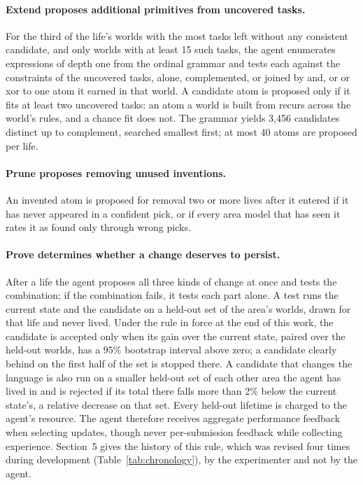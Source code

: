 \documentclass[11pt]{article}
\begin{document}
\paragraph{Extend proposes additional primitives from uncovered tasks.} For the third of the life's worlds with the most tasks left without any consistent candidate, and only worlds with at least 15 such tasks, the agent enumerates expressions of depth one from the ordinal grammar and tests each against the constraints of the uncovered tasks, alone, complemented, or joined by and, or or xor to one atom it earned in that world. A candidate atom is proposed only if it fits at least two uncovered tasks: an atom a world is built from recurs across the world's rules, and a chance fit does not. The grammar yields 3,456 candidates distinct up to complement, searched smallest first; at most 40 atoms are proposed per life.

\paragraph{Prune proposes removing unused inventions.} An invented atom is proposed for removal two or more lives after it entered if it has never appeared in a confident pick, or if every area model that has seen it rates it as found only through wrong picks.

\paragraph{Prove determines whether a change deserves to persist.} After a life the agent proposes all three kinds of change at once and tests the combination; if the combination fails, it tests each part alone. A test runs the current state and the candidate on a held-out set of the area's worlds, drawn for that life and never lived. Under the rule in force at the end of this work, the candidate is accepted only when its gain over the current state, paired over the held-out worlds, has a 95\% bootstrap interval above zero; a candidate clearly behind on the first half of the set is stopped there. A candidate that changes the language is also run on a smaller held-out set of each other area the agent has lived in and is rejected if its total there falls more than 2\% below the current state's, a relative decrease on that set. Every held-out lifetime is charged to the agent's resource. The agent therefore receives aggregate performance feedback when selecting updates, though never per-submission feedback while collecting experience. Section~5 gives the history of this rule, which was revised four times during development (Table~\ref{tab:chronology}), by the experimenter and not by the agent.
\end{document}
